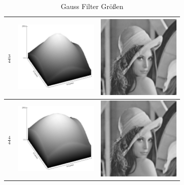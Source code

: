\documentclass[12pt,german]{article}
\begin{document}
\begin{table}[H]
\begin{tabular}{| c | c | c |}
	    \hline
    $ \frac{3}{4} $ &
	\includegraphics[width=4cm]{../testData/Gauss/GaussBellR4S3.jpg} & 	\includegraphics[width=4cm]{../testData/Gauss/LenaR4S3.jpg} \\
	    \hline
    $ \frac{4}{4} $ &
	\includegraphics[width=4cm]{../testData/Gauss/GaussBellR4S4.jpg} & 	\includegraphics[width=4cm]{../testData/Gauss/LenaR4S4.jpg} \\
  \end{tabular}
  \caption{Gauss Filter Größen}
  \label{tab:GaussFilterGroessen}
\end{table}
\end{document}
